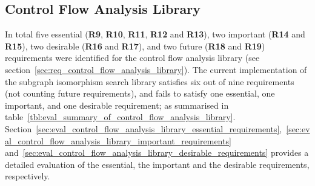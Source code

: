
\subsection{Control Flow Analysis Library}
\label{sec:eval_control_flow_analysis_library}

In total five essential (\textbf{R9}, \textbf{R10}, \textbf{R11}, \textbf{R12} and \textbf{R13}), two important (\textbf{R14} and \textbf{R15}), two desirable (\textbf{R16} and \textbf{R17}), and two future (\textbf{R18} and \textbf{R19}) requirements were identified for the control flow analysis library (see section~\ref{sec:req_control_flow_analysis_library}). The current implementation of the subgraph isomorphism search library satisfies six out of nine requirements (not counting future requirements), and fails to satisfy one essential, one important, and one desirable requirement; as summarised in table~\ref{tbl:eval_summary_of_control_flow_analysis_library}. Section~\ref{sec:eval_control_flow_analysis_library_essential_requirements},~\ref{sec:eval_control_flow_analysis_library_important_requirements} and~\ref{sec:eval_control_flow_analysis_library_desirable_requirements} provides a detailed evaluation of the essential, the important and the desirable requirements, respectively.

